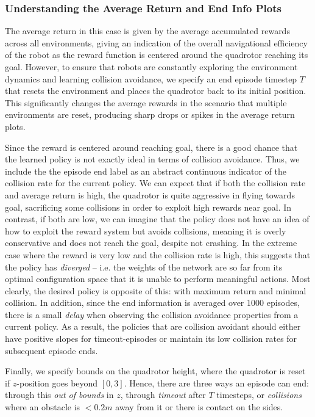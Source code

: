 \subsubsection{Understanding the Average Return and End Info Plots}
The average return in this case is given by the average accumulated rewards across all environments, giving an indication of the overall navigational efficiency of the robot as the reward function is centered around the quadrotor reaching its goal. 
However, to ensure that robots are constantly exploring the environment dynamics and learning collision avoidance, we specify an end episode timestep $T$ that resets the environment and places the quadrotor back to its initial position. This significantly changes the average rewards in the scenario that multiple environments are reset, producing sharp drops or spikes in the average return plots.

Since the reward is centered around reaching goal, there is a good chance that the learned policy is not exactly ideal in terms of collision avoidance. Thus, we include the the episode end label as an abstract continuous indicator of the collision rate for the current policy. We can expect that if both the collision rate and average return is high, the quadrotor is quite aggressive in flying towards goal, sacrificing some collisions in order to exploit high rewards near goal. In contrast, if both are low, we can imagine that the policy does not have an idea of how to exploit the reward system but avoids collisions, meaning it is overly conservative and does not reach the goal, despite not crashing. In the extreme case where the reward is very low and the collision rate is high, this suggests that the policy has \textit{diverged} -- i.e. the weights of the network are so far from its optimal configuration space that it is unable to perform meaningful actions. Most clearly, the desired policy is opposite of this: with maximum return and minimal collision. 
In addition, since the end information is averaged over 1000 episodes, there is a small \textit{delay} when observing the collision avoidance properties from a current policy. As a result, the policies that are collision avoidant should either have positive slopes for timeout-episodes or maintain its low collision rates for subsequent episode ends. 

Finally, we specify bounds on the quadrotor height, where the quadrotor is reset if $z$-position goes beyond $[0, 3]$. Hence, there are three ways an episode can end: through this \textit{out of bounds} in $z$, through \textit{timeout} after $T$ timesteps, or \textit{collisions} where an obstacle is $<0.2m$ away from it or there is contact on the sides.
 
